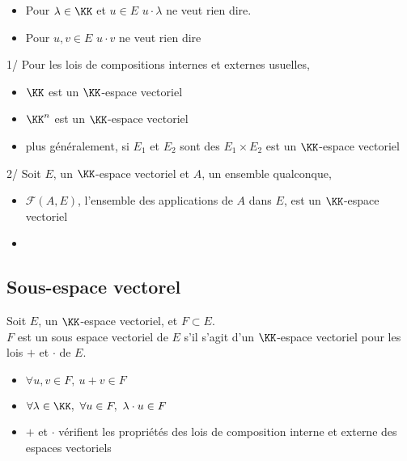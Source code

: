 \documentclass[../main.tex]{subfile}
\begin{document}
\begin{rema}
\begin{itemize}
	\item Pour $\lambda \in \KK$ et $u \in E$
	$u \cdot \lambda$ ne veut rien dire.

	\item Pour $u, v \in E$
	$u \cdot v$ ne veut rien dire
\end{itemize}
\end{rema}

\begin{ex}
	1/ Pour les lois de compositions internes et externes usuelles, 
\begin{itemize}
	\item $\KK$ est un $\KK$-espace vectoriel
	\item $\KK^n$ est un $\KK$-espace vectoriel 
	\item plus généralement, si $E_1$ et $E_2$ sont des $E_1 \times E_2$ est un $\KK$-espace vectoriel
\end{itemize}
	2/ Soit $E$, un $\KK$-espace vectoriel et $A$, un ensemble qualconque, 
\begin{itemize}
	\item $\mathcal{F}(A, E)$, l'ensemble des applications de $A$ dans $E$, est un $\KK$-espace vectoriel
	\item 
\end{itemize}
\end{ex}



\subsection{Sous-espace vectorel}

\begin{defi}
	Soit $E$, un $\KK$-espace vectoriel, et $F \subset E$.\\
	$F$ est un sous espace vectoriel de $E$ s'il s'agit d'un $\KK$-espace vectoriel pour les lois $+$ et $\cdot$ de $E$.
\begin{itemize}
	\item $\forall u, v \in F, \ u + v \in F$
	\item $\forall \lambda \in \KK, \ \forall u \in F, \ \lambda \cdot u \in F$
	\item $+$ et $\cdot$ vérifient les propriétés des lois de composition interne et externe des espaces vectoriels
\end{itemize}
\end{defi}
\end{document}
